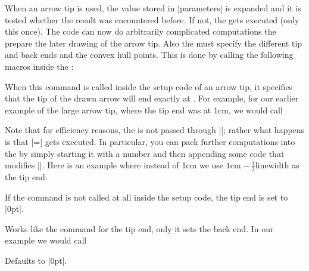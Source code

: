 \begin{command}{\pgfdeclarearrow{}}
\begin{itemize}
            When an arrow tip is used, the value stored in |parameters| is
            expanded and it is tested whether the result was encountered
            before. If not, the  gets executed (only this once). The
            code can now do arbitrarily complicated computations the prepare
            the later drawing of the arrow tip. Also the  must
            specify the different tip and back ends and the convex hull points.
            This is done by calling the following macros inside the
            :
            \begin{command}{\pgfarrowssettipend{}}
                When this command is called inside the setup code of an arrow
                tip, it specifies that the tip of the drawn arrow will end
                exactly at . For example, for our earlier
                example of the large arrow tip, where the tip end was at 1cm,
                we would call
\begin{codeexample}
\pgfarrowssettipend{1cm}
\end{codeexample}
                Note that for efficiency reasons, the  is not
                passed through |\pgfmathsetlength|; rather what happens is that
                |\pgf@x=| gets executed. In particular, you can
                pack further computations into the  by simply
                starting it with a number and then appending some code that
                modifies |\pgf@x|. Here is an example where instead of 1cm we
                use $1\mathrm{cm} - \frac12\mathrm{linewidth}$ as the tip end:
\begin{codeexample}
\end{codeexample}
                If the command is not called at all inside the setup code, the
                tip end is set to |0pt|.
            \end{command}

            \begin{command}{\pgfarrowssetbackend{}}
                Works like the command for the tip end, only it sets the back
                end. In our example we would call
\begin{codeexample}
\pgfarrowssettipend{-3cm}
\end{codeexample}
                Defaults to |0pt|.
            \end{command}


\end{itemize}
\end{command}
